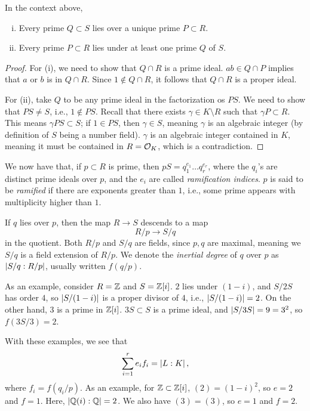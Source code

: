 \begin{theorem} \label{thm:lies_over_prime_ideal}
    In the context above,
    \begin{enumerate}[(i)]
        \item Every prime $Q \subset S$ lies over a unique prime $P \subset R$.
        \item Every prime $P \subset R$ lies under at least one prime $Q$ of $S$.
    \end{enumerate}
\end{theorem}
\begin{proof}
    For (i), we need to show that $Q \cap R$ is a prime ideal. $ab \in Q \cap P$ implies that $a$ or $b$ is in $Q \cap R$. Since $1 \notin Q \cap R$, it follows that $Q \cap R$ is a proper ideal.

    For (ii), take $Q$ to be any prime ideal in the factorization os $PS$. We need to show that $PS \neq S$, i.e., $1 \notin PS$. Recall that there exists $\gamma \in K \setminus R$ such that $\gamma P \subset R$. This means $\gamma P S \subset S$; if $1 \in PS$, then $\gamma \in S$, meaning $\gamma$ is an algebraic integer (by definition of $S$ being a number field). $\gamma$ is an algebraic integer contained in $K$, meaning it must be contained in $R = \mathcal O_K$, which is a contradiction.
\end{proof}

We now have that, if $p \subset R$ is prime, then $p S = q_1^{e_1} \dots q_r^{e_r}$, where the $q_i$'s are distinct prime ideals over $p$, and the $e_i$ are called \textit{ramification indices}. $p$ is said to be \textit{ramified} if there are exponents greater than $1$, i.e., some prime appears with multiplicity higher than $1$.

If $q$ lies over $p$, then the map $R \to S$ descends to a map
\[ R/p \to S/q \]
in the quotient. Both $R/p$ and $S/q$ are fields, since $p, q$ are maximal, meaning we $S/q$ is a field extension of $R/p$. We denote the \textit{inertial degree} of $q$ over $p$ as $\left\lvert S/q : R/p \right\rvert$, usually written $f(q/p)$.

As an example, consider $R = \mathbb Z$ and $S = \mathbb Z[i]$. $2$ lies under $(1 - i)$, and $S/2S$ has order $4$, so $\left\lvert S/(1-i) \right\rvert$ is a proper divisor of $4$, i.e., $\left\lvert S/(1-i) \right\rvert = 2$. On the other hand, $3$ is a prime in $\mathbb Z[i]$. $3S \subset S$ is a prime ideal, and $\left\lvert S/3S \right\rvert = 9 = 3^2$, so $f(3S/3) = 2$.

With these examples, we see that
\[ \sum_{i=1}^r e_i f_i = \left\lvert L : K \right\rvert, \]
where $f_i = f(q_i/p)$. As an example, for $\mathbb Z \subset \mathbb Z[i]$, $(2) = (1 - i)^2$, so $e = 2$ and $f = 1$. Here, $\left\lvert \mathbb Q(i) : \mathbb Q \right\rvert = 2$. We also have $(3) = (3)$, so $e = 1$ and $f = 2$.